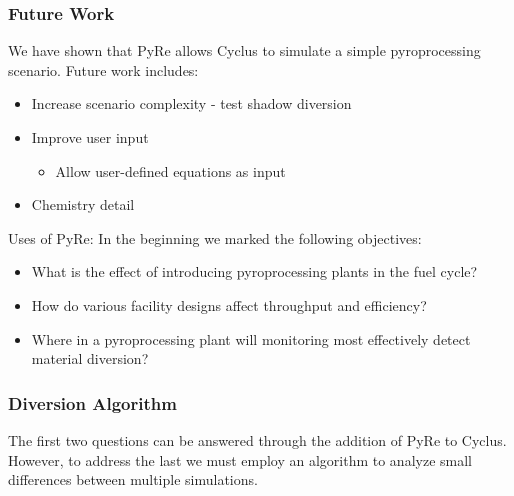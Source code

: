 \begin{frame}
  \frametitle{Future Work}
  We have shown that PyRe allows Cyclus to simulate a simple pyroprocessing scenario. Future work includes:
  \begin{itemize}
     \item Increase scenario complexity - test shadow diversion
     \item Improve user input
     \begin{itemize}
      	\item Allow user-defined equations as input
     \end{itemize}
     \item Chemistry detail
  \end{itemize}
\begin{block}{Uses of PyRe:}
	In the beginning we marked the following objectives:
\begin{itemize}
	\item What is the effect of introducing pyroprocessing plants in the fuel cycle?
	\item How do various facility designs affect throughput and efficiency?
	\item Where in a pyroprocessing plant will monitoring most 
	effectively detect material diversion?
\end{itemize}
\end{block}
\end{frame}

\begin{frame}
\frametitle{Diversion Algorithm}
The first two questions can be answered through the addition of PyRe to Cyclus. However, to address the last we must 
employ an algorithm to analyze small differences between multiple simulations.
\end{frame}
